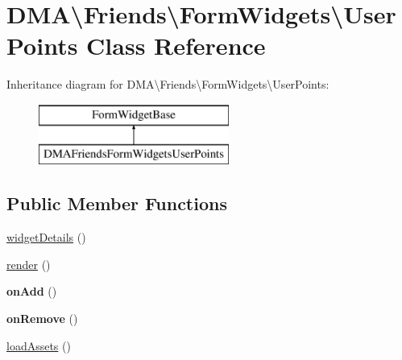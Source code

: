 \hypertarget{classDMA_1_1Friends_1_1FormWidgets_1_1UserPoints}{\section{D\+M\+A\textbackslash{}Friends\textbackslash{}Form\+Widgets\textbackslash{}User\+Points Class Reference}
\label{classDMA_1_1Friends_1_1FormWidgets_1_1UserPoints}
}
Inheritance diagram for D\+M\+A\textbackslash{}Friends\textbackslash{}Form\+Widgets\textbackslash{}User\+Points\+:\begin{figure}[H]
\begin{center}
\leavevmode
\includegraphics[height=2.000000cm]{d8/df1/classDMA_1_1Friends_1_1FormWidgets_1_1UserPoints}
\end{center}
\end{figure}
\subsection*{Public Member Functions}
\begin{DoxyCompactItemize}
\item 
\hyperlink{classDMA_1_1Friends_1_1FormWidgets_1_1UserPoints_a2f5e6b76ab55e44a579486785b7b41c7}{widget\+Details} ()
\item 
\hyperlink{classDMA_1_1Friends_1_1FormWidgets_1_1UserPoints_a910893df29c6c508ced5d84185d22bcb}{render} ()
\item 
\hypertarget{classDMA_1_1Friends_1_1FormWidgets_1_1UserPoints_a19e5e2cce310f6c8547f7b50f42c1d0f}{{\bfseries on\+Add} ()}\label{classDMA_1_1Friends_1_1FormWidgets_1_1UserPoints_a19e5e2cce310f6c8547f7b50f42c1d0f}

\item 
\hypertarget{classDMA_1_1Friends_1_1FormWidgets_1_1UserPoints_a645fcb235fd962cd346978a10b892dcb}{{\bfseries on\+Remove} ()}\label{classDMA_1_1Friends_1_1FormWidgets_1_1UserPoints_a645fcb235fd962cd346978a10b892dcb}

\item 
\hyperlink{classDMA_1_1Friends_1_1FormWidgets_1_1UserPoints_adbaf2876c58fc27d29147c94893696b1}{load\+Assets} ()
\end{DoxyCompactItemize}


